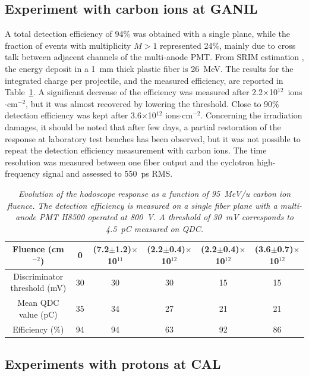 \documentclass[a4paper,11pt]{article}
\begin{document}
\subsection{Experiment with carbon ions at GANIL}
A total detection efficiency of 94\% was obtained with a single plane, while the fraction of events with multiplicity $M>1$ represented 24\%, mainly due to cross talk between adjacent channels of the multi-anode PMT.
From SRIM estimation \cite{Ziegler2010}, the energy deposit in a 1~mm thick plastic fiber is 26~MeV. The results for the integrated charge per projectile, and the measured efficiency, are reported in Table~\ref{tab:GANIL}. A significant decrease of the efficiency was measured after 2.2$\times$10$^{12}$~ions$\cdot$cm$^{-2}$, but it was almost recovered by lowering the threshold. 
Close to 90\% detection efficiency was kept after 3.6$\times$10$^{12}$ ions$\cdot$cm$^{-2}$.
Concerning the irradiation damages, it should be noted that after few days, a partial restoration of the response at laboratory test benches has been observed, but it was not possible to repeat the detection efficiency measurement with carbon ions. 
The time resolution was measured between one fiber output and the cyclotron high-frequency signal and assessed to 550~ps RMS. 
\begin{table}[htb]
\caption{\small{\textit{Evolution of the hodoscope response as a function of 95~MeV/u carbon ion fluence. The detection efficiency is measured on a single fiber plane with a multi-anode PMT H8500 operated at 800~V. A threshold of 30~mV corresponds to 4.5~pC measured on QDC.}}}
\centering
\begin{tabular}{|c|c|c|c|c|c|}
\hline
Fluence (cm$^{-2}$)& 0 & (7.2$\pm$1.2)$\times$10$^{11}$ & (2.2$\pm$0.4)$\times$10$^{12}$ & (2.2$\pm$0.4)$\times$10$^{12}$ & (3.6$\pm$0.7)$\times$10$^{12}$\\
\hline
\makecell{Discriminator\\threshold (mV)} & 30 & 30 & 30 & 15 & 15\\
\hline
\makecell{Mean QDC\\value (pC)} & 35 & 34 & 27 & 21 & 21\\
\hline
Efficiency (\%) & 94 & 94 & 63 & 92 & 86\\
\hline
\end{tabular}
\label{tab:GANIL}
\end{table}

\subsection{Experiments with protons at CAL}
\end{document}
